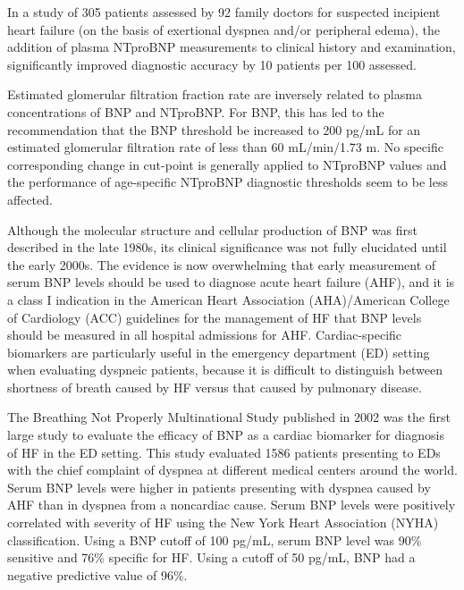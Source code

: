 \documentclass[14pt,a4paper,onecolumn]{extarticle}
\begin{document}
In a study of 305 patients assessed by 92 family doctors for suspected incipient heart failure (on the basis of exertional dyspnea and/or peripheral edema), the addition of plasma NTproBNP measurements to clinical history and examination, significantly improved diagnostic accuracy by 10 patients per 100 assessed. \citep{bib3133}


Estimated glomerular filtration fraction rate are inversely related to plasma concentrations of BNP and NTproBNP. For BNP, this has led to the recommendation that the BNP threshold be increased to 200 pg/mL for an estimated glomerular filtration rate of less than 60 mL/min/1.73 m. No specific corresponding change in cut-point is generally applied to NTproBNP values and the performance of age-specific NTproBNP diagnostic thresholds seem to be less affected. \citep{DeFilippi2008}

Although the molecular structure and cellular production of BNP was first described in the late 1980s, its clinical significance was not fully elucidated until the early 2000s. The evidence is now overwhelming that early measurement of serum BNP levels should be used to diagnose acute heart failure (AHF), and it is a class I indication in the American Heart Association (AHA)/American College of Cardiology (ACC) guidelines for the management of HF that BNP levels should be measured in all hospital admissions for AHF. Cardiac-specific biomarkers are particularly useful in the emergency department (ED) setting when evaluating dyspneic patients, because it is difficult to distinguish between shortness of breath caused by HF versus that caused by pulmonary disease. \citep{Maisel2018}

The Breathing Not Properly Multinational Study published in 2002 was the first large study to evaluate the efficacy of BNP as a cardiac biomarker for diagnosis of HF in the ED setting. This study evaluated 1586 patients presenting to EDs with the chief complaint of dyspnea at different medical centers around the world. Serum BNP levels were higher in patients presenting with dyspnea caused by AHF than in dyspnea from a noncardiac cause. Serum BNP levels were positively correlated with severity of HF using the New York Heart Association (NYHA) classification. Using a BNP cutoff of 100 pg/mL, serum BNP level was 90\% sensitive and 76\% specific for HF. Using a cutoff of 50 pg/mL, BNP had a negative predictive value of 96\%. \citep{Maisel2002} %
\end{document}
